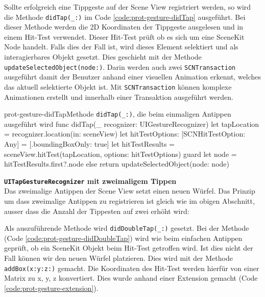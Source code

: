 \begin{description}
    Sollte erfolgreich eine Tippgeste auf der Scene View registriert werden, so wird die Methode \texttt{didTap(\_:)} im Code \ref{code:prot-gesture-didTap} ausgeführt. Bei dieser Methode werden die 2D Koordinaten der Tippgeste ausgelesen und in einem Hit-Test verwendet. Dieser Hit-Test prüft ob es sich um eine SceneKit Node handelt. Falls dies der Fall ist, wird dieses Element selektiert und als interagierbares Objekt gesetzt. Dies geschieht mit der Methode \texttt{updateSelectedObject(node:)}. Darin werden auch zwei \texttt{SCNTransaction} ausgeführt damit der Benutzer anhand einer visuellen Animation erkennt, welches das aktuell selektierte Objekt ist. Mit \texttt{SCNTransaction} können komplexe Animationen erstellt und innerhalb einer Transaktion ausgeführt werden.

    \begin{code}{prot-gesture-didTap}{Methode \texttt{didTap(\_:)}, die beim einmaligen Antippen ausgeführt wird}
    func didTap(_ recognizer: UIGestureRecognizer) {
        let tapLocation = recognizer.location(in: sceneView)
        let hitTestOptions: [SCNHitTestOption: Any] = [.boundingBoxOnly: true]
        let hitTestResults = sceneView.hitTest(tapLocation, options: hitTestOptions)
        guard let node = hitTestResults.first?.node else {return}
        updateSelectedObject(node: node)
    }
    \end{code}

    \textbf{\texttt{UITapGestureRecognizer} mit zweimaligem Tippen}\\
    Das zweimalige Antippen der Scene View setzt einen neuen Würfel. Das Prinzip um dass zweimalige Antippen zu registrieren ist gleich wie im obigen Abschnitt, ausser dass die Anzahl der Tippesten auf zwei erhöht wird:

    Als auszuführende Methode wird \texttt{didDoubleTap(\_:)} gesetzt. Bei der Methode (Code \ref{code:prot-gesture-didDoubleTap}) wird wie beim einfachen Antippen geprüft, ob ein SceneKit Objekt beim Hit-Test getroffen wird. Ist dies nicht der Fall können wir den neuen Würfel platzieren. Dies wird mit der Methode \texttt{addBox(x:y:z:)} gemacht. Die Koordinaten des Hit-Test werden hierfür von einer Matrix zu x, y, z konvertiert. Dies wurde anhand einer Extension gemacht (Code \ref{code:prot-gesture-extension}).


\end{description}
